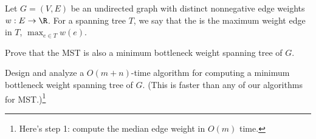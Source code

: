 \documentclass{article}
\begin{document}
 Let \( G=(V,E) \) be an undirected graph with distinct nonnegative edge weights \( w:E\to\R \).
For a spanning tree \( T \), we say that the  is the maximum weight edge in \( T \), \( \max_{e\in T} w(e) \).
\setcounter{section}{16}
\setcounter{exercise}{6}
\begin{subexercise}
Prove that the MST is also a minimum bottleneck weight spanning tree of \( G \).
\end{subexercise}

\begin{solution}

\end{solution}
\pagebreak

\begin{subexercise}
  Design and analyze a \( O(m + n) \)-time algorithm for computing a minimum
bottleneck weight spanning tree of \( G \).
(This is faster than any of our algorithms for MST.)\footnote[4]{Here's step 1: compute the median edge weight in \( O(m) \) time.}
\end{subexercise}

\begin{solution}

\end{solution}
\pagebreak
\end{document}
